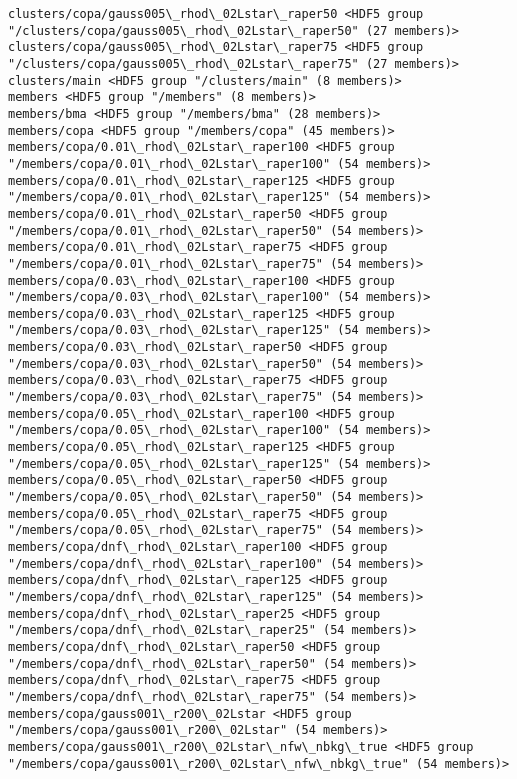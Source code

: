 \documentclass[11pt]{article}
\begin{document}
\begin{Verbatim}[commandchars=\\\{\}]
clusters/copa/gauss005\_rhod\_02Lstar\_raper50 <HDF5 group "/clusters/copa/gauss005\_rhod\_02Lstar\_raper50" (27 members)>
clusters/copa/gauss005\_rhod\_02Lstar\_raper75 <HDF5 group "/clusters/copa/gauss005\_rhod\_02Lstar\_raper75" (27 members)>
clusters/main <HDF5 group "/clusters/main" (8 members)>
members <HDF5 group "/members" (8 members)>
members/bma <HDF5 group "/members/bma" (28 members)>
members/copa <HDF5 group "/members/copa" (45 members)>
members/copa/0.01\_rhod\_02Lstar\_raper100 <HDF5 group "/members/copa/0.01\_rhod\_02Lstar\_raper100" (54 members)>
members/copa/0.01\_rhod\_02Lstar\_raper125 <HDF5 group "/members/copa/0.01\_rhod\_02Lstar\_raper125" (54 members)>
members/copa/0.01\_rhod\_02Lstar\_raper50 <HDF5 group "/members/copa/0.01\_rhod\_02Lstar\_raper50" (54 members)>
members/copa/0.01\_rhod\_02Lstar\_raper75 <HDF5 group "/members/copa/0.01\_rhod\_02Lstar\_raper75" (54 members)>
members/copa/0.03\_rhod\_02Lstar\_raper100 <HDF5 group "/members/copa/0.03\_rhod\_02Lstar\_raper100" (54 members)>
members/copa/0.03\_rhod\_02Lstar\_raper125 <HDF5 group "/members/copa/0.03\_rhod\_02Lstar\_raper125" (54 members)>
members/copa/0.03\_rhod\_02Lstar\_raper50 <HDF5 group "/members/copa/0.03\_rhod\_02Lstar\_raper50" (54 members)>
members/copa/0.03\_rhod\_02Lstar\_raper75 <HDF5 group "/members/copa/0.03\_rhod\_02Lstar\_raper75" (54 members)>
members/copa/0.05\_rhod\_02Lstar\_raper100 <HDF5 group "/members/copa/0.05\_rhod\_02Lstar\_raper100" (54 members)>
members/copa/0.05\_rhod\_02Lstar\_raper125 <HDF5 group "/members/copa/0.05\_rhod\_02Lstar\_raper125" (54 members)>
members/copa/0.05\_rhod\_02Lstar\_raper50 <HDF5 group "/members/copa/0.05\_rhod\_02Lstar\_raper50" (54 members)>
members/copa/0.05\_rhod\_02Lstar\_raper75 <HDF5 group "/members/copa/0.05\_rhod\_02Lstar\_raper75" (54 members)>
members/copa/dnf\_rhod\_02Lstar\_raper100 <HDF5 group "/members/copa/dnf\_rhod\_02Lstar\_raper100" (54 members)>
members/copa/dnf\_rhod\_02Lstar\_raper125 <HDF5 group "/members/copa/dnf\_rhod\_02Lstar\_raper125" (54 members)>
members/copa/dnf\_rhod\_02Lstar\_raper25 <HDF5 group "/members/copa/dnf\_rhod\_02Lstar\_raper25" (54 members)>
members/copa/dnf\_rhod\_02Lstar\_raper50 <HDF5 group "/members/copa/dnf\_rhod\_02Lstar\_raper50" (54 members)>
members/copa/dnf\_rhod\_02Lstar\_raper75 <HDF5 group "/members/copa/dnf\_rhod\_02Lstar\_raper75" (54 members)>
members/copa/gauss001\_r200\_02Lstar <HDF5 group "/members/copa/gauss001\_r200\_02Lstar" (54 members)>
members/copa/gauss001\_r200\_02Lstar\_nfw\_nbkg\_true <HDF5 group "/members/copa/gauss001\_r200\_02Lstar\_nfw\_nbkg\_true" (54 members)>

\end{Verbatim}
\end{document}
